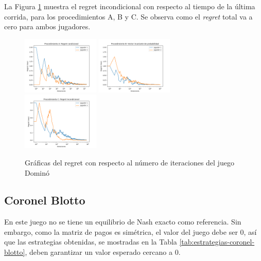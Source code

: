 La Figura \ref{fig:regret-domino} muestra el regret incondicional con respecto al tiempo de la última corrida, para los procedimientos A, B y C. Se observa como el \textit{regret} total va a cero para ambos jugadores.

\begin{figure}[ht]
\caption{Gráficas del regret con respecto al número de iteraciones del juego Dominó}
\label{fig:regret-domino}
\centering
\includegraphics[width=0.327\textwidth]{graficas/domino/procedimiento-A.png}
\includegraphics[width=0.327\textwidth]{graficas/domino/procedimiento-B.png}
\includegraphics[width=0.327\textwidth]{graficas/domino/procedimiento-C.png}
\end{figure}

\subsection{Coronel Blotto}

En este juego no se tiene un equilibrio de Nash exacto como referencia. Sin embargo, como la matriz de pagos es simétrica, el valor del juego debe ser $0$, así que las estrategias obtenidas, se mostradas en la Tabla \ref{tab:estrategias-coronel-blotto}, deben garantizar un valor esperado cercano a $0$. 

